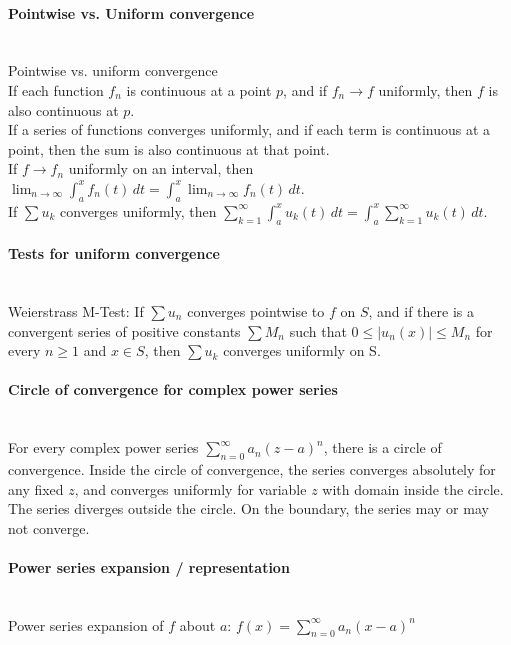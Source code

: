 \documentclass[10pt]{article}
\begin{document}
\paragraph{Pointwise vs. Uniform convergence}\ \\
Pointwise vs. uniform convergence\\
If each function $f_n$ is continuous at a point $p$, and if $f_n \to f$ uniformly, then $f$ is also continuous at $p$.\\
If a series of functions converges uniformly, and if each term is continuous at a point, then the sum is also continuous at that point.\\
If $f \to f_n$ uniformly on an interval, then $\lim_{n\to\infty}\int_a^xf_n(t)\,dt=\int_a^x\lim_{n\to\infty}f_n(t)\,dt$.\\
If $\sum u_k$ converges uniformly, then $\sum_{k=1}^\infty\int_a^xu_k(t)\,dt=\int_a^x\sum_{k=1}^\infty u_k(t)\,dt$.

\paragraph{Tests for uniform convergence}\ \\
Weierstrass M-Test: If $\sum u_n$ converges pointwise to $f$ on $S$, and if there is a convergent series of
positive constants $\sum M_n$ such that $0 \leq |u_n(x)| \leq M_n$ for every $n \geq 1$ and $x \in S$,
then $\sum u_k$ converges uniformly on S.

\paragraph{Circle of convergence for complex power series}\ \\
For every complex power series $\sum_{n=0}^\infty a_n(z-a)^n$, there is a circle of convergence.  Inside the circle
of convergence, the series converges absolutely for any fixed $z$, and converges uniformly for variable
$z$ with domain inside the circle.  The series diverges outside the circle.  On the boundary, the series
may or may not converge.

\paragraph{Power series expansion / representation}\ \\
Power series expansion of $f$ about $a$: $f(x)=\sum_{n=0}^\infty a_n(x-a)^n$
\end{document}
